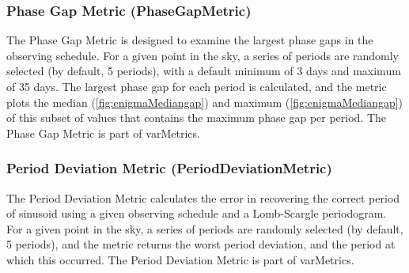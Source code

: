 \subsubsection{Phase Gap Metric (PhaseGapMetric)}

The Phase Gap Metric is designed to examine the largest phase gaps in the observing schedule. For a given point in the sky, a series of periods are randomly selected (by default, 5 periods), with a default minimum of 3 days and maximum of 35 days. The largest phase gap for each period is calculated, and the metric plots the median (\autoref{fig:enigmaMediangap}) and maximum (\autoref{fig:enigmaMediangap}) of this subset of values that contains the maximum phase gap per period. The Phase Gap Metric is part of varMetrics.

\subsubsection{Period Deviation Metric (PeriodDeviationMetric)}

The Period Deviation Metric calculates the error in recovering the correct period of sinusoid using a given observing schedule and a Lomb-Scargle periodogram. For a given point in the sky, a series of periods are randomly selected (by default, 5 periods), and the metric returns the worst period deviation, and the period at which this occurred. The Period Deviation Metric is part of varMetrics.























